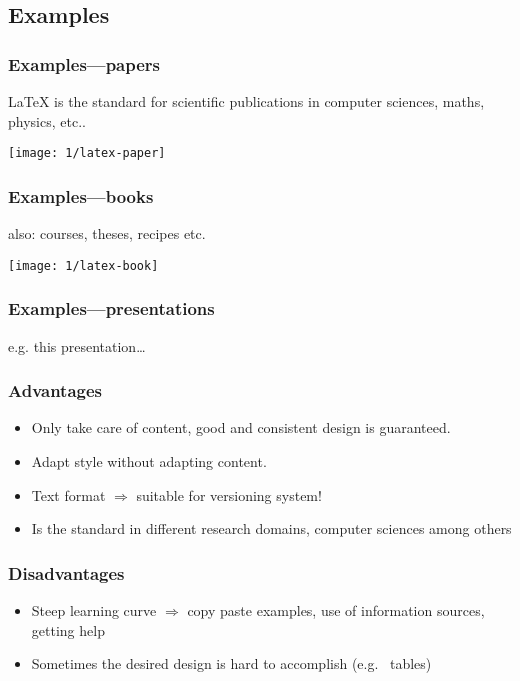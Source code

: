 \documentclass[aspectratio=169]{beamer}
\begin{document}
\subsection{Examples}

\begin{frame}
  \frametitle{Examples---papers}

  {\LaTeX} is the standard for scientific publications in computer sciences, maths, physics, etc..

  \begin{center}
    \texttt{[image: 1/latex-paper]}
  \end{center}

\end{frame}

\begin{frame}
  \frametitle{Examples---books}

  also: courses, theses, recipes etc. 

  \begin{center}
    \texttt{[image: 1/latex-book]}
  \end{center}

\end{frame}

\begin{frame}
  \frametitle{Examples---presentations}

  \begin{center}
    e.g. this presentation\ldots
  \end{center}

\end{frame}

\begin{frame}
  \frametitle{Advantages}

  \begin{itemize}
    \item<+-> Only take care of content, good and consistent design is guaranteed.
    \item<+-> Adapt style without adapting content.
    \item<+-> Text format \(\Rightarrow\) suitable for versioning system!
    \item<+-> Is the standard in different research domains, computer sciences among others
  \end{itemize}
\end{frame}


\begin{frame}
  \frametitle{Disadvantages}

  \begin{itemize}
    \item<+-> Steep learning curve \(\Rightarrow\) copy paste examples, use of information sources, getting help
    \item<+-> Sometimes the desired design is hard to accomplish (e.g. ~tables)
  \end{itemize}

\end{frame}
\end{document}
